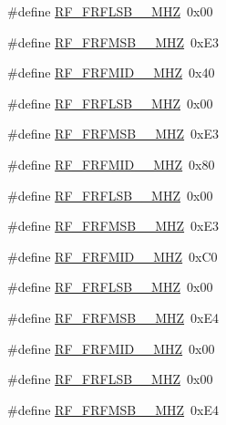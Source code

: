 \begin{DoxyCompactItemize}
\item 
\#define \mbox{\hyperlink{sx1276_regs-_fsk_8h_a3b906ff98326799d71d01c4d0439c349}{R\+F\+\_\+\+F\+R\+F\+L\+S\+B\+\_\+\_\+\+M\+HZ}}~0x00
\item 
\#define \mbox{\hyperlink{sx1276_regs-_fsk_8h_aa30208849f839f0bd46fa5bcce4a1b4d}{R\+F\+\_\+\+F\+R\+F\+M\+S\+B\+\_\+\_\+\+M\+HZ}}~0x\+E3
\item 
\#define \mbox{\hyperlink{sx1276_regs-_fsk_8h_a0f2dfb97900c562d6097dc14bed35164}{R\+F\+\_\+\+F\+R\+F\+M\+I\+D\+\_\+\_\+\+M\+HZ}}~0x40
\item 
\#define \mbox{\hyperlink{sx1276_regs-_fsk_8h_a7cae9ceaac8f2c67896fae0f48307539}{R\+F\+\_\+\+F\+R\+F\+L\+S\+B\+\_\+\_\+\+M\+HZ}}~0x00
\item 
\#define \mbox{\hyperlink{sx1276_regs-_fsk_8h_ab768211f38db9d1409de34ae1a4e07ae}{R\+F\+\_\+\+F\+R\+F\+M\+S\+B\+\_\+\_\+\+M\+HZ}}~0x\+E3
\item 
\#define \mbox{\hyperlink{sx1276_regs-_fsk_8h_a3602c77fb8c46ec1aa8c8bc23455181d}{R\+F\+\_\+\+F\+R\+F\+M\+I\+D\+\_\+\_\+\+M\+HZ}}~0x80
\item 
\#define \mbox{\hyperlink{sx1276_regs-_fsk_8h_a480899d8b9136ea63dc5382d206def71}{R\+F\+\_\+\+F\+R\+F\+L\+S\+B\+\_\+\_\+\+M\+HZ}}~0x00
\item 
\#define \mbox{\hyperlink{sx1276_regs-_fsk_8h_a7dca7fbccfb186de24ab3c46a1a2d70b}{R\+F\+\_\+\+F\+R\+F\+M\+S\+B\+\_\+\_\+\+M\+HZ}}~0x\+E3
\item 
\#define \mbox{\hyperlink{sx1276_regs-_fsk_8h_abbadaaee53f7f5a47b4d7e06efe12f5b}{R\+F\+\_\+\+F\+R\+F\+M\+I\+D\+\_\+\_\+\+M\+HZ}}~0x\+C0
\item 
\#define \mbox{\hyperlink{sx1276_regs-_fsk_8h_ab6ba47c7782eb528dc506a3af1c8792b}{R\+F\+\_\+\+F\+R\+F\+L\+S\+B\+\_\+\_\+\+M\+HZ}}~0x00
\item 
\#define \mbox{\hyperlink{sx1276_regs-_fsk_8h_a8a8c4525592e8d79144da83beaf3bda8}{R\+F\+\_\+\+F\+R\+F\+M\+S\+B\+\_\+\_\+\+M\+HZ}}~0x\+E4
\item 
\#define \mbox{\hyperlink{sx1276_regs-_fsk_8h_ad0aa8be155a01fea5b88cf0f0973f93b}{R\+F\+\_\+\+F\+R\+F\+M\+I\+D\+\_\+\_\+\+M\+HZ}}~0x00
\item 
\#define \mbox{\hyperlink{sx1276_regs-_fsk_8h_a0a5d15119dbdf4aefbc6c11d65c2b360}{R\+F\+\_\+\+F\+R\+F\+L\+S\+B\+\_\+\_\+\+M\+HZ}}~0x00
\item 
\#define \mbox{\hyperlink{sx1276_regs-_fsk_8h_aed868e22bd165fab920c66816c665033}{R\+F\+\_\+\+F\+R\+F\+M\+S\+B\+\_\+\_\+\+M\+HZ}}~0x\+E4

\end{DoxyCompactItemize}
